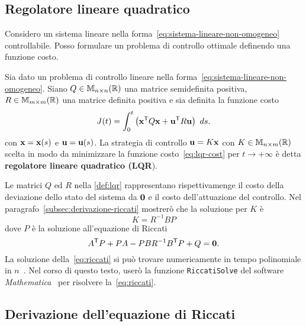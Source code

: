 \subsection{Regolatore lineare quadratico}
Considero un sistema lineare nella forma~\eqref{eq:sistema-lineare-non-omogeneo} controllabile.
Posso formulare un problema di controllo ottimale definendo una funzione costo.
\begin{definition}
    Sia dato un problema di controllo lineare nella forma~\eqref{eq:sistema-lineare-non-omogeneo}.
    Siano $Q \in \mathbb{M}_{n\times n}(\mathbb{R})$ una matrice semidefinita positiva, $R \in \mathbb{M}_{m\times m}(\mathbb{R})$ una matrice definita positiva
    e sia definita la funzione costo
    \begin{equation}
        J(t) = \int_0^t
            \left( \mathbf{x}^{\mathsf{T}} Q \mathbf{x} + \mathbf{u}^{\mathsf{T}} R \mathbf{u} \right)
        \ ds.
        \label{eq:lqr-cost}
    \end{equation}
    con $\mathbf{x} = \mathbf{x}(s)$ e $\mathbf{u} = \mathbf{u}(s)$.
    La strategia di controllo $\mathbf{u} = K\mathbf{x}$ con $K \in \mathbb{M}_{n\times m}(\mathbb{R})$ scelta in modo da
    minimizzare la funzione costo~\eqref{eq:lqr-cost} per $t \to +\infty$ è
    detta \textbf{regolatore lineare quadratico (\textsc{LQR}}).
    \label{def:lqr}
\end{definition}
Le matrici $Q$ ed $R$ nella \autoref{def:lqr} rappresentano rispettivamenge
il costo della deviazione dello stato del sistema da $\mathbf{0}$ e il costo dell'attuazione del
controllo.
Nel paragrafo~\ref{subsec:derivazione-riccati} mostrerò che la soluzione per $K$ è
\begin{equation}
    K = R^{-1}BP
    \label{eq:riccati-K}
\end{equation}
dove $P$ è la soluzione all'equazione di Riccati
\begin{equation}
        A^{\mathsf{T}} P + P A - P B R^{-1} B^{\mathsf{T}} P + Q = \mathbf{0}.
    \label{eq:riccati}
\end{equation}
La soluzione della~\eqref{eq:riccati} si può trovare numericamente in tempo polinomiale
in $n$~\cite{riccatiO3}.
Nel corso di questo testo, userò la funzione \verb|RiccatiSolve| del software
\emph{Mathematica}~\cite{Mathematica} per risolvere la~\eqref{eq:riccati}.

\subsection{Derivazione dell'equazione di Riccati}

